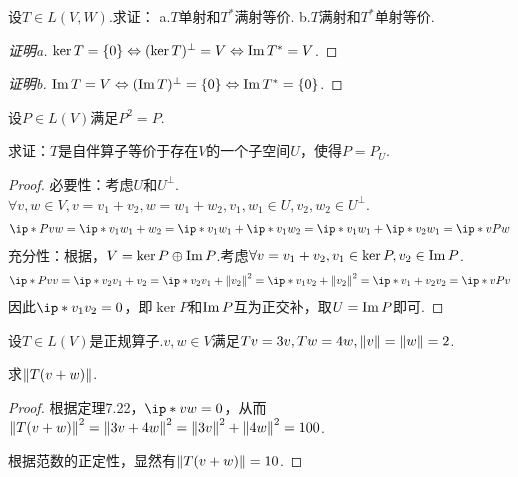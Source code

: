 \begin{problem}[4]\label{7.A.4}
    设\(T \in L(V,W)\).求证：
    a.\(T\)单射和\(T^*\)满射等价. \quad b.\(T\)满射和\(T^*\)单射等价.
\end{problem}

\begin{proof}[证明a]
    \(\ker T=\{0\} \Leftrightarrow (\ker T)^\bot=V \Leftrightarrow \Img T^*=V\).
\end{proof}

\begin{proof}[证明b]
    \(\Img T=V \Leftrightarrow (\Img T)^\bot=\{0\} \Leftrightarrow \Img T^*=\{0\}\).
\end{proof}

\begin{problem}[11]\label{7.A.11}
    设\(P \in L(V)\)满足\(P^2=P\).
    
    求证：\(T\)是自伴算子等价于存在\(V\)的一个子空间\(U\)，使得\(P=P_U\).
\end{problem}

\begin{proof}
    必要性：考虑\(U\)和\(U^\bot\).\(\forall v,w \in V,v=v_1+v_2,w=w_1+w_2,v_1,w_1 \in U,v_2,w_2 \in U^\bot\).
    \begin{align*}
        \ip*{Pv}{w}=\ip*{v_1}{w_1+w_2}=\ip*{v_1}{w_1}+\ip*{v_1}{w_2}=\ip*{v_1}{w_1}+\ip*{v_2}{w_1}=\ip*{v}{Pw}
    \end{align*}
    充分性：根据，\(V= \ker P \oplus \Img P\).考虑\(\forall v=v_1+v_2,v_1 \in \ker P,v_2 \in \Img P\).
    \begin{align*}
        \ip*{Pv}{v}=\ip*{v_2}{v_1+v_2}=\ip*{v_2}{v_1}+\norm*{v_2}^2
        =\ip*{v_1}{v_2}+\norm*{v_2}^2=\ip*{v_1+v_2}{v_2}=\ip*{v}{Pv}
    \end{align*}
    因此\(\ip*{v_1}{v_2}=0\)，即\(\ker P\)和\(\Img P\)互为正交补，取\(U=\Img P\)即可.
\end{proof}

\newpage

\begin{problem}[14]\label{7.A.14}
    设\(T \in L(V)\)是正规算子.\(v,w \in V\)满足\(Tv=3v,Tw=4w,\norm*{v}=\norm*{w}=2\).

    求\(\norm*{T(v+w)}\).
\end{problem}

\begin{proof}
    根据定理7.22，\(\ip*{v}{w}=0\)，从而\(\norm*{T(v+w)}^2=\norm*{3v+4w}^2=\norm*{3v}^2+\norm*{4w}^2=100\).
    
    根据范数的正定性，显然有\(\norm*{T(v+w)}=10\).
\end{proof}

